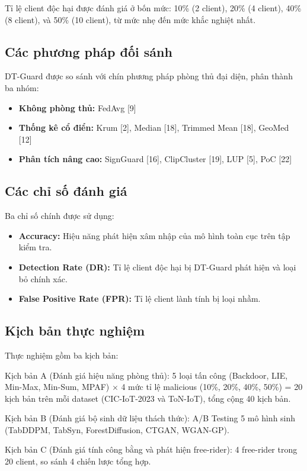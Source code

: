 Tỉ lệ client độc hại được đánh giá ở bốn mức: 10\% (2 client), 20\% (4 client), 40\% (8 client), và 50\% (10 client), từ mức nhẹ đến mức khắc nghiệt nhất.

\subsection{Các phương pháp đối sánh}
DT-Guard được so sánh với chín phương pháp phòng thủ đại diện, phân thành ba nhóm:

\begin{itemize}
\item
  \textbf{Không phòng thủ:} FedAvg {[}9{]}
\item
  \textbf{Thống kê cổ điển:} Krum {[}2{]}, Median {[}18{]}, Trimmed Mean {[}18{]}, GeoMed {[}12{]}
\item
  \textbf{Phân tích nâng cao:} SignGuard {[}16{]}, ClipCluster {[}19{]}, LUP {[}5{]}, PoC {[}22{]}
\end{itemize}

\subsection{Các chỉ số đánh giá}
Ba chỉ số chính được sử dụng:

\begin{itemize}
\item
  \textbf{Accuracy:} Hiệu năng phát hiện xâm nhập của mô hình toàn cục trên tập kiểm tra.
\item
  \textbf{Detection Rate (DR):} Tỉ lệ client độc hại bị DT-Guard phát hiện và loại bỏ chính xác.
\item
  \textbf{False Positive Rate (FPR):} Tỉ lệ client lành tính bị loại nhầm.
\end{itemize}

\subsection{Kịch bản thực nghiệm}
Thực nghiệm gồm ba kịch bản:

Kịch bản A (Đánh giá hiệu năng phòng thủ): 5 loại tấn công (Backdoor, LIE, Min-Max, Min-Sum, MPAF) $\times$ 4 mức tỉ lệ malicious (10\%, 20\%, 40\%, 50\%) = 20 kịch bản trên mỗi dataset (CIC-IoT-2023 và ToN-IoT), tổng cộng 40 kịch bản.

Kịch bản B (Đánh giá bộ sinh dữ liệu thách thức): A/B Testing 5 mô hình sinh (TabDDPM, TabSyn, ForestDiffusion, CTGAN, WGAN-GP).

Kịch bản C (Đánh giá tính công bằng và phát hiện free-rider): 4 free-rider trong 20 client, so sánh 4 chiến lược tổng hợp.


